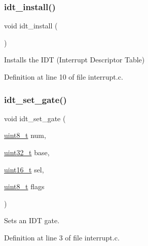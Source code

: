 \subsubsection{\texorpdfstring{idt\+\_\+install()}{idt\_install()}}
{\footnotesize\ttfamily void idt\+\_\+install (\begin{DoxyParamCaption}{ }\end{DoxyParamCaption})}



Installs the I\+DT (Interrupt Descriptor Table) 



Definition at line 10 of file interrupt.\+c.

\mbox{\label{a00014_a498f153edfbc59b873e0ae610c3b0335_a498f153edfbc59b873e0ae610c3b0335}} 
\subsubsection{\texorpdfstring{idt\+\_\+set\+\_\+gate()}{idt\_set\_gate()}}
{\footnotesize\ttfamily void idt\+\_\+set\+\_\+gate (\begin{DoxyParamCaption}\item[{\hyperlink{a00032_aba7bc1797add20fe3efdf37ced1182c5_aba7bc1797add20fe3efdf37ced1182c5}{uint8\+\_\+t}}]{num,  }\item[{\hyperlink{a00032_a435d1572bf3f880d55459d9805097f62_a435d1572bf3f880d55459d9805097f62}{uint32\+\_\+t}}]{base,  }\item[{\hyperlink{a00032_a273cf69d639a59973b6019625df33e30_a273cf69d639a59973b6019625df33e30}{uint16\+\_\+t}}]{sel,  }\item[{\hyperlink{a00032_aba7bc1797add20fe3efdf37ced1182c5_aba7bc1797add20fe3efdf37ced1182c5}{uint8\+\_\+t}}]{flags }\end{DoxyParamCaption})}



Sets an I\+DT gate. 



Definition at line 3 of file interrupt.\+c.

